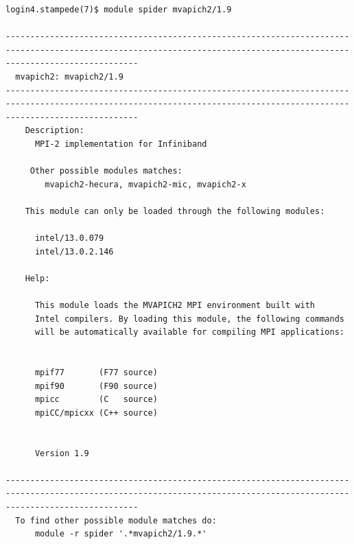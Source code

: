 \documentclass{article}
\begin{document}
\begin{verbatim}
login4.stampede(7)$ module spider mvapich2/1.9

-----------------------------------------------------------------------------------------------------------------------------------------------------------------------
  mvapich2: mvapich2/1.9
-----------------------------------------------------------------------------------------------------------------------------------------------------------------------
    Description:
      MPI-2 implementation for Infiniband 

     Other possible modules matches:
        mvapich2-hecura, mvapich2-mic, mvapich2-x

    This module can only be loaded through the following modules:

      intel/13.0.079
      intel/13.0.2.146
 
    Help:
       
      This module loads the MVAPICH2 MPI environment built with
      Intel compilers. By loading this module, the following commands
      will be automatically available for compiling MPI applications:
      
      
      mpif77       (F77 source)
      mpif90       (F90 source)
      mpicc        (C   source)
      mpiCC/mpicxx (C++ source)
      
      
      Version 1.9
      
-----------------------------------------------------------------------------------------------------------------------------------------------------------------------
  To find other possible module matches do:
      module -r spider '.*mvapich2/1.9.*'
\end{verbatim}
\normalsize


\scriptsize
\begin{verbatim}

                                                           
\end{verbatim}
\normalsize


\end{document}
